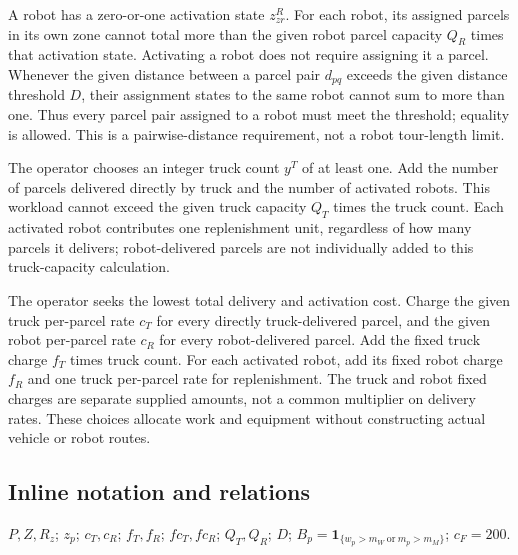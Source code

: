 \documentclass[10pt]{article}
\begin{document}
A robot has a zero-or-one activation state $z_{zr}^R$. For each robot, its assigned parcels in its own zone cannot total more than the given robot parcel capacity $Q_R$ times that activation state. Activating a robot does not require assigning it a parcel. Whenever the given distance between a parcel pair $d_{pq}$ exceeds the given distance threshold $D$, their assignment states to the same robot cannot sum to more than one. Thus every parcel pair assigned to a robot must meet the threshold; equality is allowed. This is a pairwise-distance requirement, not a robot tour-length limit.

The operator chooses an integer truck count $y^T$ of at least one. Add the number of parcels delivered directly by truck and the number of activated robots. This workload cannot exceed the given truck capacity $Q_T$ times the truck count. Each activated robot contributes one replenishment unit, regardless of how many parcels it delivers; robot-delivered parcels are not individually added to this truck-capacity calculation.

The operator seeks the lowest total delivery and activation cost. Charge the given truck per-parcel rate $c_T$ for every directly truck-delivered parcel, and the given robot per-parcel rate $c_R$ for every robot-delivered parcel. Add the fixed truck charge $f_T$ times truck count. For each activated robot, add its fixed robot charge $f_R$ and one truck per-parcel rate for replenishment. The truck and robot fixed charges are separate supplied amounts, not a common multiplier on delivery rates. These choices allocate work and equipment without constructing actual vehicle or robot routes.

\subsection*{Inline notation and relations}
$P,Z,R_z$; $z_p$; $c_T,c_R$; $f_T,f_R$; $fc_T,fc_R$; $Q_T,Q_R$; $D$; $B_p=\mathbf1_{\{w_p>m_W\ \mathrm{or}\ m_p>m_M\}}$; $c_F=200$.
\end{document}
